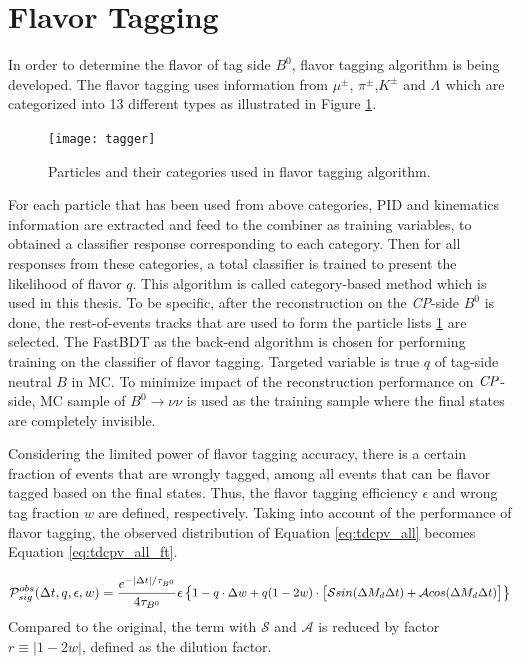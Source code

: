 \section{Flavor Tagging}
 In order to determine the flavor of tag side $B^0$, flavor tagging algorithm is being developed. The flavor tagging uses information from $\mu^{\pm}$, $\pi^{\pm}$,$K^{\pm}$ and $\Lambda^{}$ which are categorized into 13 different types as illustrated in Figure \ref{fig:flavortagger}. 

\begin{figure}[H]
\centering
\texttt{[image: tagger]}
\caption{Particles and their categories used in flavor tagging algorithm\cite{flavortagger}.}
\label{fig:flavortagger}
\end{figure}
 
 
For each particle that has been used from above categories, PID and kinematics information are extracted and feed to the combiner as training variables, to obtained a classifier response corresponding to each category. Then for all responses from these categories, a total classifier is trained to present the likelihood of flavor $q$. This algorithm is called category-based method which is used in this thesis. To be specific, after the reconstruction on the \textit{CP}-side $B^0$ is done, the rest-of-events tracks that are used to form the particle lists \ref{fig:flavortagger} are selected. The FastBDT as the back-end algorithm is chosen for performing training on the classifier of flavor tagging. Targeted variable is true $q$ of tag-side neutral $B$ in MC. To minimize impact of the reconstruction performance on $\it{CP}$-side, MC sample of $B^0 \to \nu \nu$ is used as the training sample where the final states are completely invisible. 

Considering the limited power of flavor tagging accuracy, there is a certain fraction of events that are wrongly tagged, among all events that can be flavor tagged based on the final states. Thus, the flavor tagging efficiency $\epsilon$ and wrong tag fraction $w$ are defined, respectively. Taking into account of the performance of flavor tagging, the observed distribution of Equation \ref{eq:tdcpv_all} becomes Equation \ref{eq:tdcpv_all_ft}.

\begin{equation}\label{eq:tdcpv_all_ft}
\small
\mathcal{P}_{sig}^{obs}(\Delta t, q, \epsilon, w) = 
\frac{e^{-|\Delta t|/\tau_{B^0}}}{4\tau_{B^0}}
\epsilon
\begin{Bmatrix}
1 - q\cdot \Delta w+ q(1-2w)\cdot 
\begin{bmatrix}
\mathcal{S}sin(\Delta M_d \Delta t) + 
\mathcal{A}cos(\Delta M_d \Delta t)
\end{bmatrix}
\end{Bmatrix}
\end{equation} 
Compared to the original, the term with $\mathcal{S}$ and $\mathcal{A}$ is reduced by factor $r\equiv |1-2w|$, defined as the dilution factor. 

